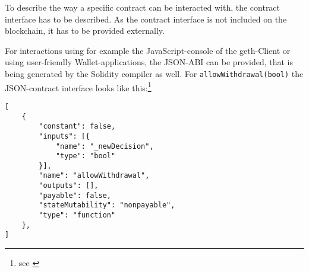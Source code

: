 To describe the way a specific contract can be interacted with, the contract interface has to be described. As the contract interface is not included on the blockchain, it has to be provided externally.

For interactions using for example the JavaScript-console of the geth-Client or using user-friendly Wallet-applications, the JSON-ABI can be provided, that is being generated by the Solidity compiler as well. For \texttt{allowWithdrawal(bool)} the JSON-contract interface looks like this:\footnote{see \cite[Application Binary Interface Specification]{ethereum:solidity}}

\begin{verbatim}
[
    {
        "constant": false,
        "inputs": [{
            "name": "_newDecision",
            "type": "bool"
        }],
        "name": "allowWithdrawal",
        "outputs": [],
        "payable": false,
        "stateMutability": "nonpayable",
        "type": "function"
    },
]
\end{verbatim}

